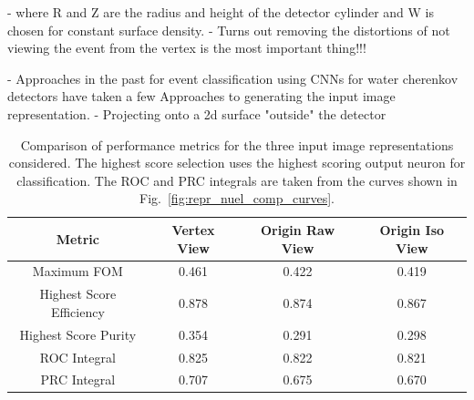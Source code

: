 - where R and Z are the radius and height of the detector cylinder and W is chosen for constant
surface density.
- Turns out removing the distortions of not viewing the event from the vertex is the most
important thing!!!

- Approaches in the past for event classification using CNNs for water cherenkov detectors have
taken a few Approaches to generating the input image representation.
- Projecting onto a 2d surface "outside" the detector

\begin{table}
    \begin{tabular}{cccc}
        Metric                   & Vertex View & Origin Raw View & Origin Iso View \\
        \midrule
        Maximum FOM              & 0.461       & 0.422           & 0.419           \\
        Highest Score Efficiency & 0.878       & 0.874           & 0.867           \\
        Highest Score Purity     & 0.354       & 0.291           & 0.298           \\
        ROC Integral             & 0.825       & 0.822           & 0.821           \\
        PRC Integral             & 0.707       & 0.675           & 0.670           \\
    \end{tabular}
    \caption[Comparison of performance metrics for three input image representations.]
    {Comparison of performance metrics for the three input image representations considered. The
        highest score selection uses the highest scoring output neuron for classification. The ROC
        and PRC integrals are taken from the curves shown in
        Fig.~\ref{fig:repr_nuel_comp_curves}.}
    \label{tab:repr}
\end{table}


